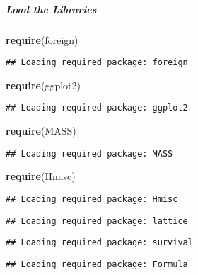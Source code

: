 \documentclass[]{article}
\newenvironment{Shaded}{\begin{snugshade}}{\end{snugshade}}
\newcommand{\KeywordTok}[1]{\textcolor[rgb]{0.13,0.29,0.53}{\textbf{#1}}}
\newcommand{\NormalTok}[1]{#1}
\let\oldsubparagraph\subparagraph
\renewcommand{\subparagraph}[1]{\oldsubparagraph{#1}\mbox{}}
\begin{document}
\subparagraph{Load the Libraries}\label{load-the-libraries}

\begin{Shaded}
\begin{Highlighting}[]
\KeywordTok{require}\NormalTok{(foreign)}
\end{Highlighting}
\end{Shaded}

\begin{verbatim}
## Loading required package: foreign
\end{verbatim}

\begin{Shaded}
\begin{Highlighting}[]
\KeywordTok{require}\NormalTok{(ggplot2)}
\end{Highlighting}
\end{Shaded}

\begin{verbatim}
## Loading required package: ggplot2
\end{verbatim}

\begin{Shaded}
\begin{Highlighting}[]
\KeywordTok{require}\NormalTok{(MASS)}
\end{Highlighting}
\end{Shaded}

\begin{verbatim}
## Loading required package: MASS
\end{verbatim}

\begin{Shaded}
\begin{Highlighting}[]
\KeywordTok{require}\NormalTok{(Hmisc)}
\end{Highlighting}
\end{Shaded}

\begin{verbatim}
## Loading required package: Hmisc
\end{verbatim}

\begin{verbatim}
## Loading required package: lattice
\end{verbatim}

\begin{verbatim}
## Loading required package: survival
\end{verbatim}

\begin{verbatim}
## Loading required package: Formula
\end{verbatim}
\end{document}

